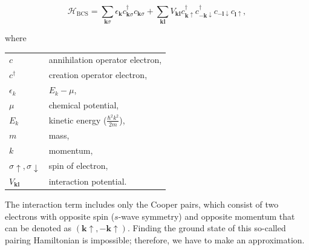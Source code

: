 \begin{equation}
\mathcal{H}_{\textrm{BCS}}=\sum_{\bm{k}\sigma}\epsilon_{\bm{k}}c_{\bm{k}\sigma}^{\dagger}c_{\bm{k}\sigma}+\sum_{\bm{k}\bm{l}}V_{\bm{k}\bm{l}}c_{\bm{k}\uparrow}^{\dagger}c_{-\bm{k}\downarrow}^{\dagger}c_{-\bm{l}\downarrow}c_{\bm{l}\uparrow},\label{eq:BCS}
\end{equation}

where

\begin{tabular}{ll}
$c$            & annihilation operator electron,\tabularnewline
$c^{\dagger}$  & creation operator electron,\tabularnewline
$\epsilon_{k}$ & $E_{k}-\mu$,\tabularnewline
$\mu$          & chemical potential,\tabularnewline
$E_{k}$        & kinetic energy ($\frac{\hbar^{2}k^{2}}{2m}$),\tabularnewline
$m$            & mass,\tabularnewline
$k$            & momentum,\tabularnewline
$\sigma\uparrow,\sigma\downarrow$  & spin of electron,\tabularnewline
$V_{\bm{kl}}$  & interaction potential.\tabularnewline
\end{tabular}

The interaction term includes only the Cooper pairs, which consist of two electrons with opposite spin ($s$-wave symmetry) and opposite momentum that can be denoted as $(\bm{\bm{k}}\uparrow,-\bm{k}\uparrow)$.
Finding the ground state of this so-called pairing Hamiltonian is impossible; therefore, we have to make an approximation.  %


